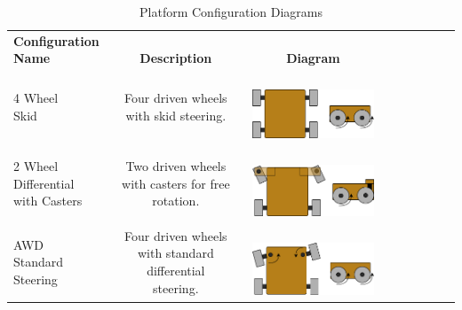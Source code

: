 \documentclass[12pt]{extarticle}
\begin{document}
     \begin{table}[H]
		
		
		\caption*{\sffamily\fontsize{12}{14}\selectfont 
		Platform Configuration Diagrams}
		\label{PlatformConfigDiagramsTable}
		\begin{adjustwidth}{-1in}{-1in}
		\centering
		\setlength{\dashlinedash}{.5pt}
		\setlength\tabcolsep{4pt}
		\def\arraystretch{1.9}
		

		\begin{tabular}{lcccccccc}
		\hline
        \makecell{\textbf{Configuration}\\ \textbf{Name}} & \makecell{\\ \textbf{Description}} & \makecell{\\ \textbf{Diagram}}  \\ 
		\makecell[l]{4 Wheel \\ Skid} &  \makecell[l]{Four driven wheels \\ with skid steering.} &  \makecell[l]{\\ \includegraphics[width=4cm]{4_wheel_skid}} \\  
		\makecell[l]{2 Wheel \\ Differential \\ with Casters} &  \makecell[l]{Two driven wheels \\ with casters for free \\ rotation.} &  \makecell[l]{\\ \includegraphics[width=4cm]{2_wheel_diff}} \\
		\makecell[l]{AWD \\ Standard \\ Steering} &  \makecell[l]{Four driven wheels \\ with standard differential \\ steering.} &  \makecell[l]{\\ \includegraphics[width=4cm]{awd_standard_steer}} \\

\end{tabular}
\end{adjustwidth}
\end{table}
\end{document}
